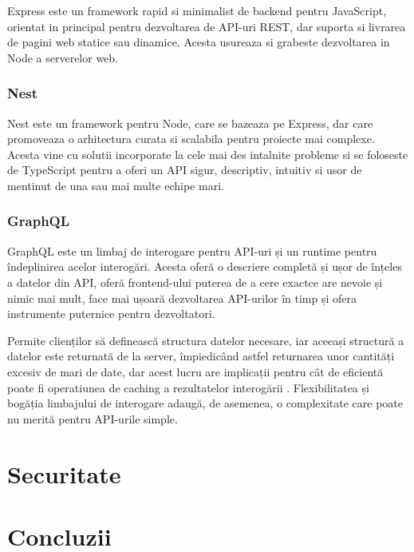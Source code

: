 \documentclass[12pt, a4paper, oneside, romanian]{teza-upb}
\begin{document}
Express este un framework rapid si minimalist de backend pentru JavaScript, orientat in principal pentru dezvoltarea de API-uri REST, dar suporta si livrarea de pagini web statice sau dinamice. Acesta usureaza si grabeste dezvoltarea in Node a serverelor web.

\subsection{Nest}

Nest este un framework pentru Node, care se bazeaza pe Express, dar care promoveaza o arhitectura curata si scalabila pentru proiecte mai complexe. Acesta vine cu solutii incorporate la cele mai des intalnite probleme si se foloseste de TypeScript pentru a oferi un API sigur, descriptiv, intuitiv si usor de mentinut de una sau mai multe echipe mari.

\subsection{GraphQL}

GraphQL este un limbaj de interogare pentru API-uri și un runtime pentru îndeplinirea acelor interogări. Acesta oferă o descriere completă și ușor de înțeles a datelor din API, oferă frontend-ului puterea de a cere exactce are nevoie și nimic mai mult, face mai ușoară dezvoltarea API-urilor în timp și ofera instrumente puternice pentru dezvoltatori.

Permite clienților să definească structura datelor necesare, iar aceeași structură a datelor este returnată de la server, împiedicând astfel returnarea unor cantități excesiv de mari de date, dar acest lucru are implicații pentru cât de eficientă poate fi operatiunea de caching a rezultatelor interogării . Flexibilitatea și bogăția limbajului de interogare adaugă, de asemenea, o complexitate care poate nu merită pentru API-urile simple. 

\chapter{Securitate}

\chapter*{Concluzii}




\end{document}
